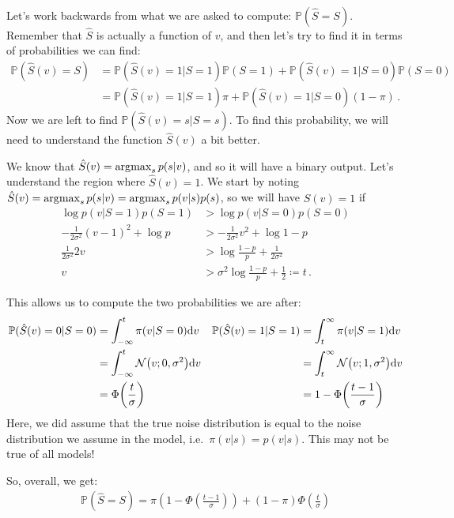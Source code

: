 \paragraph{}
Let's work backwards from what we are asked to compute: $\mathbb{P}(\hat S = S)$. Remember that $\hat S$ is actually a function of $v$, and then let's try to find it in terms of probabilities we can find:
\begin{align}
\mathbb P(\hat S(v) = S) &= \mathbb P(\hat S(v) = 1|S=1)\mathbb P(S=1) + \mathbb P(\hat S(v) = 1|S=0)\mathbb P(S=0) \\
&=\mathbb P(\hat S(v) = 1|S=1) \pi + \mathbb P(\hat S(v) = 1|S=0) (1-\pi) \,.
\end{align}
Now we are left to find $\mathbb P(\hat S(v) = s|S=s)$. To find this probability, we will need to understand the function $\hat S(v)$ a bit better.

We know that $\hat S(v) = \operatorname*{\arg\!\max}_s p(s|v)$, and so it will have a binary output. Let's understand the region where $\hat S(v) = 1$. We start by noting $\hat S(v) = \operatorname*{\arg\!\max}_s p(s|v) = \operatorname*{\arg\!\max}_s p(v|s)p(s)$, so we will have $\hat S(v) = 1$ if
\begin{align}
\log p(v|S=1)p(S=1) &> \log p(v|S=0)p(S=0) \\
-\frac{1}{2\sigma^2}(v-1)^2 + \log p &> -\frac{1}{2\sigma^2}v^2 + \log 1-p \\
\frac{1}{2\sigma^2}2v &> \log \frac{1-p}{p} + \frac{1}{2\sigma^2} \\
v &> \sigma^2\log \frac{1-p}{p} + \frac{1}{2} \coloneqq t \,.
\end{align}

This allows us to compute the two probabilities we are after:
\begin{align}
\mathbb P(\hat S(v) = 0|S=0) &= \int_{-\infty}^t \pi(v|S=0)\calcd v &
\mathbb P(\hat S(v) = 1|S=1) &= \int_{t}^\infty \pi(v|S=1)\calcd v \\
&= \int_{-\infty}^t \NormDist{v; 0, \sigma^2} \calcd v & &= \int_t^\infty \NormDist{v; 1, \sigma^2}\calcd v \\
&= \Phi\left(\frac{t}{\sigma}\right) & &= 1-\Phi\left(\frac{t-1}{\sigma}\right)
\end{align}
Here, we did assume that the true noise distribution is equal to the noise distribution we assume in the model, i.e.~$\pi(v|s) = p(v|s)$. This may not be true of all models!

So, overall, we get:
\begin{align}
\mathbb P(\hat S = S) = \pi \left(1-\Phi\left(\frac{t-1}{\sigma}\right)\right) + (1-\pi)\Phi\left(\frac{t}{\sigma}\right)
\end{align}

